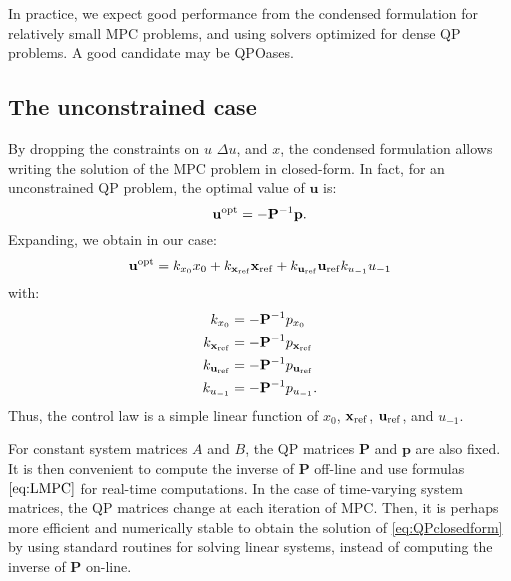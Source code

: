 \documentclass[a4paper,12pt,fleqn]{article}
\newcommand{\PQP}{\mathbf{P}}
\newcommand{\qQP}{\mathbf{p}}
\newcommand{\varxvec}{\mathbf{x}}
\newcommand{\varuvec}{\mathbf{u}}
\newcommand{\baru}{u_{-1}}
\begin{document}
In practice, we expect good performance from the condensed formulation for relatively small MPC problems, and using solvers optimized 
for dense QP problems. A good candidate may be QPOases.

\subsection{The unconstrained case}
By dropping the constraints on $u$ $\Delta u$, and $x$, the condensed formulation allows writing the solution of the MPC problem
in closed-form. In fact, for an unconstrained QP problem, the optimal value of $\varuvec$ is:
\begin{equation}
 \label{eq:QPclosedform}
 \varuvec^{\rm opt} = -\PQP^{-1}\qQP.
\end{equation}
Expanding, we obtain in our case:
\begin{equation}
 \varuvec^{\rm opt} = k_{x_0} x_0 + k_{\varxvec_{\rm ref}}\varxvec_{\rm ref} + k_{\varuvec_{\rm ref}} \varuvec_{\rm ref} k_{\baru} \baru
\end{equation}
with:
\begin{subequations}
\begin{align}
\label{eq:LMPC}
k_{x_0} &= -\PQP^{-1}p_{x_0}\\
k_{\varxvec_{\rm ref}} &= -\PQP^{-1}p_{\varxvec_{\rm ref}}\\
k_{\varuvec_{\rm ref}} &= -\PQP^{-1}p_{\varuvec_{\rm ref}}\\
k_{\baru} &= -\PQP^{-1}p_{\baru}.
\end{align}
\end{subequations}
Thus, the control law is a simple linear function of $x_0$, $\varxvec_{\rm ref}$, $\varuvec_{\rm ref}$, and $u_{-1}$.


For constant system matrices $A$ and $B$, the QP matrices $\PQP$ and $\qQP$ are also fixed. It is then convenient to compute the inverse of $\PQP$ off-line and use formulas $\eqref{eq:LMPC}$ for real-time computations. In the case of time-varying system matrices, the QP matrices change at each iteration of MPC. Then, it is perhaps more efficient and numerically stable to obtain the solution of \eqref{eq:QPclosedform} by using standard routines for solving linear systems, instead of computing the inverse of $\PQP$ on-line.
\end{document}
